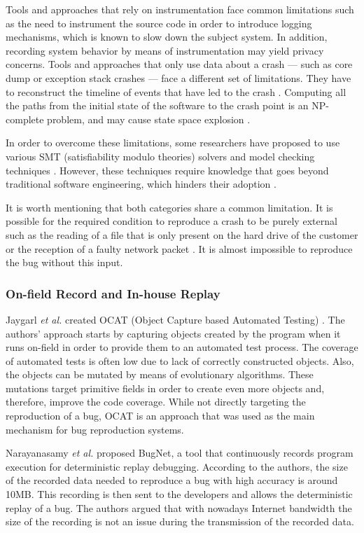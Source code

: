 Tools and approaches that rely on instrumentation face common limitations such as the need to instrument the source code in order to introduce logging mechanisms\cite{Narayanasamy2005,Jaygarl,Artzi2008}, which is known to slow down the subject system.
In addition,  recording system behavior by means of instrumentation may yield privacy concerns.
Tools and approaches that only use data about a crash --- such as core dump or exception stack crashes --- face a different set of limitations. They have to reconstruct the timeline of events that have led to the crash \cite{Chen2013a,Nayrolles2015}.
Computing all the paths from the initial state of the software to the crash point is an NP-complete problem, and may cause state space explosion \cite{Chen2013a,Clause2007}.

In order to overcome these limitations, some researchers have proposed to use various SMT (satisfiability modulo theories) solvers \cite{Dutertre2006} and model checking techniques \cite{Visser2003}.
However, these techniques require knowledge that goes beyond traditional software engineering, which hinders their adoption  \cite{Visser2004}.

It is worth mentioning that both categories share a common limitation.
It is possible for the required condition to reproduce a crash to be purely external such as the reading of a file that is only present on the hard drive of the customer or the reception of a faulty network packet \cite{Chen2013a, Nayrolles2015}.
It is almost impossible to reproduce the bug without this input.

\subsubsection{On-field Record and In-house Replay}

Jaygarl {\it et al.} created OCAT (Object Capture based Automated Testing) \cite{Jaygarl}.
The authors' approach starts by capturing objects created by the program when it runs on-field in order to provide them to an automated test process.
The coverage of automated tests is often low due to lack of correctly constructed objects. Also, the objects can be mutated by means of evolutionary algorithms.
These mutations target primitive fields in order to create even more objects and, therefore, improve the code coverage.
While not directly targeting the reproduction of a bug, OCAT is an approach that was used as the main mechanism for bug reproduction systems.

Narayanasamy {\it et al.} \cite{Narayanasamy2005} proposed BugNet, a tool that continuously records program execution for deterministic replay debugging.
According to the authors, the size of the recorded data needed to reproduce a bug with high accuracy is around 10MB.
This recording is then sent to the developers and allows the deterministic replay of a bug.
The authors argued that with nowadays Internet bandwidth the size of the recording is not an issue during the transmission of the recorded data.

